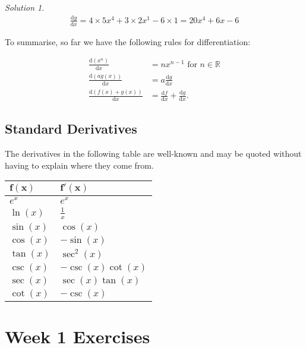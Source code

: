 \documentclass[
  11pt,
  oneside]{book}
\newcommand{\slide}{}
\theoremstyle{definition}
\theoremstyle{definition}
\theoremstyle{definition}
\theoremstyle{definition}
\theoremstyle{remark}
\newtheorem*{solution}{Solution}
\begin{document}
\begin{solution}
\begin{gather*}
\frac{\mathrm{d} y}{\mathrm{d} x} = 4\times5x^4 + 3\times 2x^1 - 6\times1 = 20x^4+6x-6
\end{gather*}
\end{solution}

\slide

To summarise, so far we have the following rules for differentiation:

\begin{align*}
\frac{\mathrm{d}(x^n)}{\mathrm{d} x} &= nx^{n-1}\text{ for }n\in{\mathbb R}\\
\frac{\mathrm{d}(ag(x))}{\mathrm{d} x} &= a\frac{\mathrm{d} g}{\mathrm{d} x}\\
\frac{\mathrm{d}(f(x)+g(x))}{\mathrm{d} x} &= \frac{\mathrm{d} f}{\mathrm{d} x}+\frac{\mathrm{d} g}{\mathrm{d} x}.
\end{align*}
\slide

\section{Standard Derivatives}\label{standard-derivatives}

The derivatives in the following table are well-known and may be quoted without having to explain where they come from.

\begin{longtable}[]{@{}ll@{}}
\toprule\noalign{}
\(\mathbf{f(x)}\) & \(\mathbf{f'(x)}\) \\
\midrule\noalign{}
\endhead
\bottomrule\noalign{}
\endlastfoot
\(e^x\) & \(e^x\) \\
\(\ln(x)\) & \(\frac{1}{x}\) \\
\(\sin(x)\) & \(\cos(x)\) \\
\(\cos(x)\) & \(-\sin(x)\) \\
\(\tan(x)\) & \(\sec^2(x)\) \\
\(\csc(x)\) & \(-\csc(x)\cot(x)\) \\
\(\sec(x)\) & \(\sec(x)\tan(x)\) \\
\(\cot(x)\) & \(-\csc(x)\) \\
\end{longtable}

\chapter*{Week 1 Exercises}\label{week-1-exercises}
\end{document}
